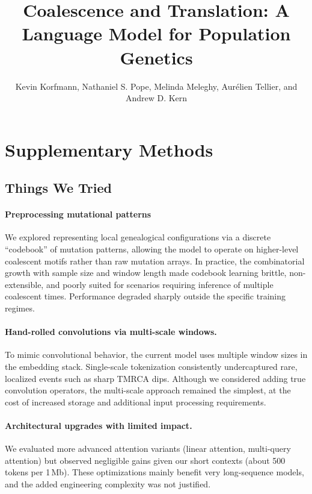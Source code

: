 \documentclass[9pt,twoside]{pnas-new}
\title{Coalescence and Translation: A Language Model for Population Genetics}
\author{Kevin Korfmann, Nathaniel S. Pope, Melinda Meleghy, Aur\'elien Tellier, and Andrew D. Kern}
\begin{document}
\maketitle

\SItext

\section*{Supplementary Methods}

\subsection*{Things We Tried}

\paragraph{Preprocessing mutational patterns}
We explored representing local genealogical configurations via a discrete
``codebook'' of mutation patterns, allowing the model to operate on higher-level
coalescent motifs rather than raw mutation arrays. In practice, the
combinatorial growth with sample size and window length made codebook learning
brittle, non-extensible, and poorly suited for scenarios requiring inference of
multiple coalescent times. Performance degraded sharply outside the specific
training regimes.

\paragraph{Hand-rolled convolutions via multi-scale windows.}
To mimic convolutional behavior, the current model uses multiple window sizes
in the embedding stack. Single-scale tokenization consistently undercaptured
rare, localized events such as sharp TMRCA dips. Although we considered adding
true convolution operators, the multi-scale approach remained the simplest, at the cost of increased storage and additional input processing requirements.

\paragraph{Architectural upgrades with limited impact.}
We evaluated more advanced attention variants (linear
attention, multi-query attention) but observed negligible gains given our short
contexts (about 500 tokens per 1\,Mb). These optimizations mainly benefit
very long-sequence models, and the added engineering complexity was not
justified.
\end{document}
